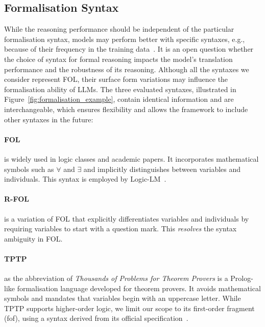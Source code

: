 \subsection{Formalisation Syntax}
\label{subsec:syntax}

While the reasoning performance should be independent of the particular formalisation syntax, models may perform better with specific syntaxes, e.g., because of their frequency in the training data~\cite{razeghi2022impact}.
It is an open question whether the choice of syntax for formal reasoning impacts the model's translation performance and the robustness of its reasoning. Although all the syntaxes we consider represent \ac{FOL}, their surface form variations may influence the formalisation ability of \acp{LLM}.
The three evaluated syntaxes, illustrated in Figure~\ref{fig:formalisation_example}, contain identical information and are interchangeable, which ensures flexibility and allows the framework to include other syntaxes in the future:

\paragraph{FOL} is widely used in logic classes and academic papers. It incorporates mathematical symbols such as $\forall$ and $\exists$ and implicitly distinguishes between variables and individuals. This syntax is employed by Logic-LM~\cite{liangming_pan_logiclm_2023}.
\paragraph{R-FOL} is a variation of \ac{FOL} that explicitly differentiates variables and individuals by requiring variables to start with a question mark. This \emph{resolves} the syntax ambiguity in \ac{FOL}. 
\paragraph{TPTP} as the abbreviation of \emph{Thousands of Problems for Theorem Provers} is a Prolog-like formalisation language developed for theorem provers. It avoids mathematical symbols and mandates that variables begin with an uppercase letter. While TPTP supports higher-order logic, we limit our scope to its first-order fragment (fof), using a syntax derived from its official specification~\cite{Sut24}.

